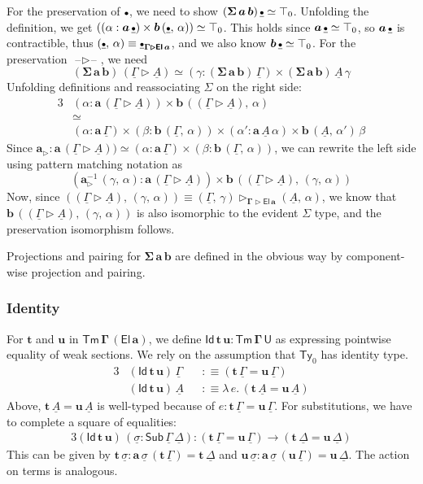 \documentclass[12pt,a4paper,twoside,openany]{book}
\theoremstyle{remark}
\theoremstyle{definition}
\theoremstyle{theorem}
\newcommand{\bs}[1]{\boldsymbol{#1}}
\newcommand{\Sub}{\mathsf{Sub}}
\newcommand{\Tm}{\mathsf{Tm}}
\newcommand{\Ty}{\mathsf{Ty}}
\newcommand{\U}{\mathsf{U}}
\newcommand{\El}{\mathsf{El}}
\newcommand{\Id}{\mathsf{Id}}
\newcommand{\blank}{\mathord{\hspace{1pt}\text{--}\hspace{1pt}}}
\newcommand{\ra}{\rightarrow}
\newcommand{\ext}{\triangleright}
\newcommand{\emptycon}{\scaleobj{.75}\bullet}
\newcommand{\bTm}{\bs{\Tm}}
\newcommand{\bGamma}{\bs{\Gamma}}
\newcommand{\bt}{\bs{t}}
\newcommand{\bu}{\bs{u}}
\newcommand{\ba}{\bs{a}}
\newcommand{\bb}{\bs{b}}
\newcommand{\bU}{\bs{\U}}
\newcommand{\bEl}{\bs{\El}}
\newcommand{\bId}{\bs{\Id}}
\newcommand{\ul}[1]{\underline{#1}}
\newcommand{\ulGamma}{\ul{\Gamma}}
\newcommand{\ulDelta}{\ul{\Delta}}
\newcommand{\ulsigma}{\ul{\sigma}}
\newcommand{\ulemptycon}{\ul{\emptycon}}
\newcommand{\ulA}{\ul{A}}
\newcommand{\defn}{:\equiv}
\begin{document}
For the preservation of $\emptycon$, we need to show
$(\bs{\Sigma\,a\,b})\,\ulemptycon \simeq \top_0$. Unfolding the definition, we
get $((\alpha : \ba\,\ulemptycon) \times \bb\,(\ulemptycon,\,\alpha)) \simeq
\top_0$. This holds since $\ba\,\ulemptycon \simeq \top_0$, so
$\ba\,\ulemptycon$ is contractible, thus $(\ulemptycon,\,\alpha) \equiv
\ulemptycon_{\bs{\Gamma \ext \El\,a}}$, and we also know $\bb\,\ulemptycon
\simeq \top_0$. For the preservation $\blank\!\ext\!\blank$, we need
\[
(\bs{\Sigma\,a\,b})\,(\ulGamma \ext \ulA) \simeq (\gamma : (\bs{\Sigma\,a\,b})\,\ulGamma) \times
  (\bs{\Sigma\,a\,b})\,\ulA\,\gamma
\]
Unfolding definitions and reassociating $\Sigma$ on the right side:
\begin{alignat*}{3}
   &(\alpha : \ba\,(\ulGamma \ext \ulA)) \times \bb\,((\ulGamma \ext \ulA),\,\alpha) \\
   &\simeq \\
   &(\alpha : \ba\,\ulGamma)
           \times (\beta : \bb\,(\ulGamma,\,\alpha))
           \times (\alpha' : \ba\,\ulA\,\alpha)
           \times \bb\,(\ulA,\,\alpha')\,\beta
\end{alignat*}
Since $\ba_{\ext} : \ba\,(\ulGamma \ext \ulA)) \simeq (\alpha : \ba\,\ulGamma)
\times (\beta : \bb\,(\ulGamma,\,\alpha))$, we can rewrite the left side using
pattern matching notation as
\[
  (\ba_{\ext}^{-1}\,(\gamma,\,\alpha) : \ba\,(\ulGamma \ext \ulA))
     \times \bb\,((\ulGamma \ext \ulA),\,(\gamma,\,\alpha))
\]
Now, since $((\ulGamma \ext \ulA),\,(\gamma,\,\alpha)) \equiv (\ulGamma,\,\gamma)
\ext_{\bs{\Gamma\ext\El\,a}} (\ulA,\,\alpha)$, we know that $\bb\,((\ulGamma
\ext \ulA),\,(\gamma,\,\alpha))$ is also isomorphic to the evident $\Sigma$
type, and the preservation isomorphism follows.

Projections and pairing for $\bs{\Sigma\,a\,b}$ are defined in the obvious way by
component-wise projection and pairing.

\subsubsection{Identity}

For $\bt$ and $\bu$ in $\bTm\,\bGamma\,(\bEl\,\ba)$, we define $\bId\,\bt\,\bu
\boldsymbol{:} \bTm\,\bGamma\,\bU$ as expressing pointwise equality of weak
sections. We rely on the assumption that $\Ty_0$ has identity type.
\begin{alignat*}{3}
& (\bId\,\bt\,\bu)\,\ulGamma &&\defn (\bt\,\ulGamma = \bu\,\ulGamma)\\
& (\bId\,\bt\,\bu)\,\ulA     &&\defn \lambda\,e.\, (\bt\,\ulA = \bu\,\ulA)
\end{alignat*}
Above, $\bt\,\ulA = \bu\,\ulA$ is well-typed because of $e :
\bt\,\ulGamma = \bu\,\ulGamma$. For substitutions, we have to complete a square
of equalities:
\begin{alignat*}{3}
  (\bId\,\bt\,\bu)\,(\ulsigma : \Sub\,\ulGamma\,\ulDelta) : (\bt\,\ulGamma = \bu\,\ulGamma) \ra
       (\bt\,\ulDelta = \bu\,\ulDelta)
\end{alignat*}
This can be given by $\bt\,\ulsigma : \ba\,\ulsigma\,(\bt\,\ulGamma) =
\bt\,\ulDelta$ and $\bu\,\ulsigma : \ba\,\ulsigma\,(\bu\,\ulGamma) =
\bu\,\ulDelta$. The action on terms is analogous.
\end{document}
